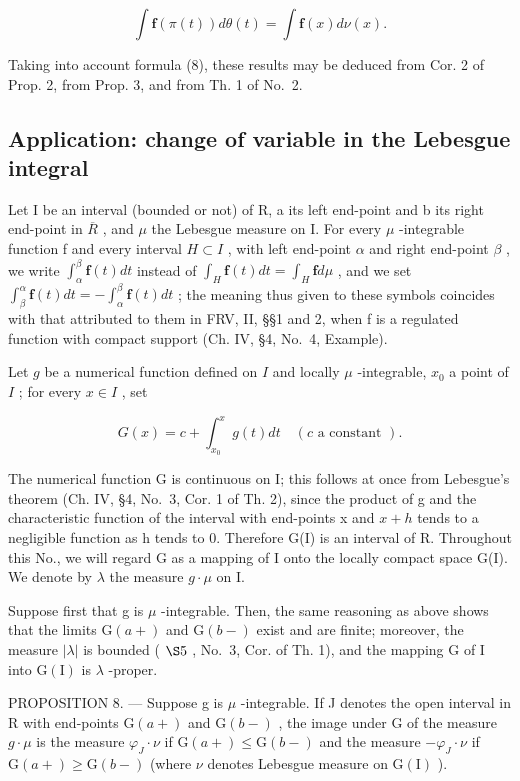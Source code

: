 \[
\int \mathbf {f} (\pi (t)) d \theta (t) = \int \mathbf {f} (x) d \nu (x).\tag{10}
\]

Taking into account formula (8), these results may be deduced from Cor. 2 of Prop. 2, from Prop. 3, and from Th. 1 of No.~2.

\subsection{Application: change of variable in the Lebesgue integral}

Let I be an interval (bounded or not) of R, a its left end-point and b its right end-point in \(\overline{R}\) , and \(\mu\) the Lebesgue measure on I. For every \(\mu\) -integrable function f and every interval \(H \subset I\) , with left end-point \(\alpha\) and right end-point \(\beta\) , we write \(\int_{\alpha}^{\beta} \mathbf{f}(t) dt\) instead of \(\int_{H} \mathbf{f}(t) dt = \int_{H} \mathbf{f} d\mu\) , and we set \(\int_{\beta}^{\alpha} \mathbf{f}(t) dt = -\int_{\alpha}^{\beta} \mathbf{f}(t) dt\) ; the meaning thus given to these symbols coincides with that attributed to them in FRV, II, §§1 and 2, when f is a regulated function with compact support (Ch. IV, §4, No.~4, Example).

Let \(g\) be a numerical function defined on \(I\) and locally \(\mu\) -integrable, \(x_0\) a point of \(I\) ; for every \(x \in I\) , set

\[
G (x) = c + \int_ {x _ {0}} ^ {x} g (t) d t \quad (c \text {   a   constant }).\tag{11}
\]

The numerical function G is continuous on I; this follows at once from Lebesgue's theorem (Ch. IV, §4, No.~3, Cor. 1 of Th. 2), since the product of g and the characteristic function of the interval with end-points x and \(x + h\) tends to a negligible function as h tends to 0. Therefore G(I) is an interval of R. Throughout this No., we will regard G as a mapping of I onto the locally compact space G(I). We denote by \(\lambda\) the measure \(g \cdot \mu\) on I.

Suppose first that g is \(\mu\) -integrable. Then, the same reasoning as above shows that the limits \(\mathrm{G}(a+)\) and \(\mathrm{G}(b-)\) exist and are finite; moreover, the measure \(|\lambda|\) is bounded ( \(\S5\) , No.~3, Cor. of Th. 1), and the mapping G of I into \(\mathrm{G}(\mathrm{I})\) is \(\lambda\) -proper.

PROPOSITION 8. --- Suppose g is \(\mu\) -integrable. If J denotes the open interval in R with end-points \(\mathrm{G}(a+)\) and \(\mathrm{G}(b-)\) , the image under G of the measure \(g \cdot \mu\) is the measure \(\varphi_{J} \cdot \nu\) if \(\mathrm{G}(a+) \leqslant \mathrm{G}(b-)\) and the measure \(-\varphi_{J} \cdot \nu\) if \(\mathrm{G}(a+) \geqslant \mathrm{G}(b-)\) (where \(\nu\) denotes Lebesgue measure on \(\mathrm{G}(\mathrm{I})\) ).

